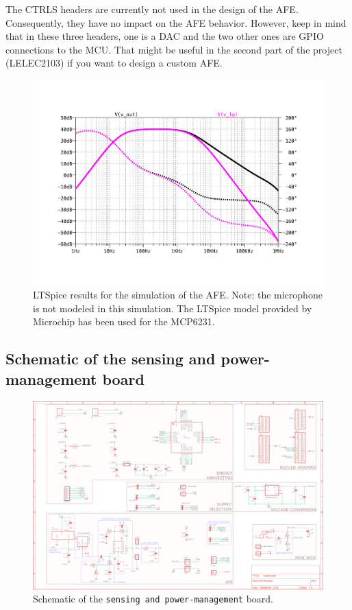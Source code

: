 The CTRLS headers are currently not used in the design of the AFE. Consequently, they have no impact on the AFE behavior. However, keep in mind that in these three headers, one is a DAC and the two other ones are GPIO connections to the MCU. That might be useful in the second part of the project (LELEC2103) if you want to design a custom AFE.




\clearpage
\begin{figure}[h!]
    \centering
    \includegraphics[scale=0.8, angle=90]{figs/bode_AFE.pdf}
    \caption{LTSpice results for the simulation of the AFE. Note: the microphone is not modeled in this simulation. The LTSpice model provided by Microchip has been used for the MCP6231.}
    \label{fig:bode_AFE}
\end{figure}

\clearpage
\subsection{Schematic of the sensing and power-management board}

\begin{figure}[h!]
    \centering
    \includegraphics[scale=1, angle=90]{figs/schematic.png}
    \caption{Schematic of the \texttt{sensing and power-management} board.}
    \label{fig:schematic}
\end{figure}
